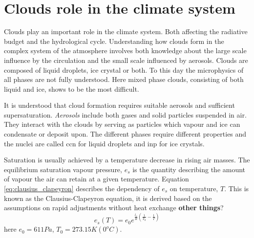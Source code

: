 \section{Clouds role in the climate system} \label{sec:cloud_in_climate_system}
Clouds play an important role in the climate system. Both affecting the radiative budget and the hydrological cycle. Understanding how clouds form in the complex system of the atmosphere involves both knowledge about the large scale influence by the circulation and the small scale influenced by aerosols. Clouds are composed of liquid droplets, ice crystal or both. To this day the microphysics of all phases are not fully understood. Here mixed phase clouds, consisting of both liquid and ice, shows to be the most difficult. 


It is understood that cloud formation requires suitable aerosols and sufficient supersaturation. \textit{Aerosols} include both gases and solid particles suspended in air. They interact with the clouds by serving as particles which vapour and ice can condensate or deposit upon. The different phases require different properties and the nuclei are called \acrfull{ccn} for liquid droplets and \acrfull{inp} for ice crystals. 

Saturation is usually achieved by a temperature decrease in rising air masses. The equilibrium saturation vapour pressure, $e_s$ is the quantity describing the amount of vapour the air can retain at a given temperature. Equation \eqref{eq:clausius_clapeyron} describes the dependency of $e_s$ on temperature, $T$. This is known as the Clausius-Clapeyron equation, it is derived based on the assumptions on rapid adjustments without heat exchange \textbf{other things}?
\begin{equation} \label{eq:clausius_clapeyron}
    e_s\left( T \right) = e_0 e^{\frac{l_v}{R} \left( \frac{1}{T_0} - \frac{1}{T} \right) }
\end{equation}
here $e_0 = 611Pa$, $T_0 = 273.15K \left(0 ^oC \right)$.

